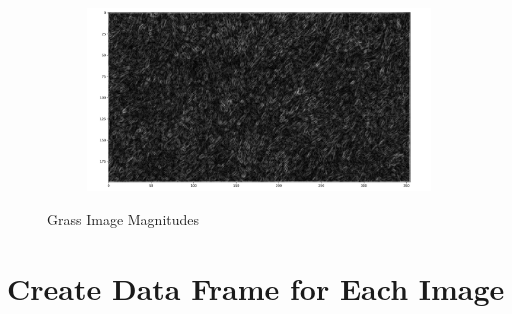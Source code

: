 \documentclass[
  letterpaper,
  DIV=11,
  numbers=noendperiod]{scrreprt}
\begin{document}
\begin{figure}
\begin{minipage}{0.33\linewidth}
\end{minipage}%
%
\begin{minipage}{0.33\linewidth}

\begin{figure}[H]

{\centering \includegraphics{images/plots/grass/close_up_living_lab_grass_mag.png}

}


\end{figure}%

\end{minipage}%

\caption{\label{fig-grass-mags}Grass Image Magnitudes}

\end{figure}%

\section{Create Data Frame for Each
Image}\label{create-data-frame-for-each-image-1}
\end{document}
